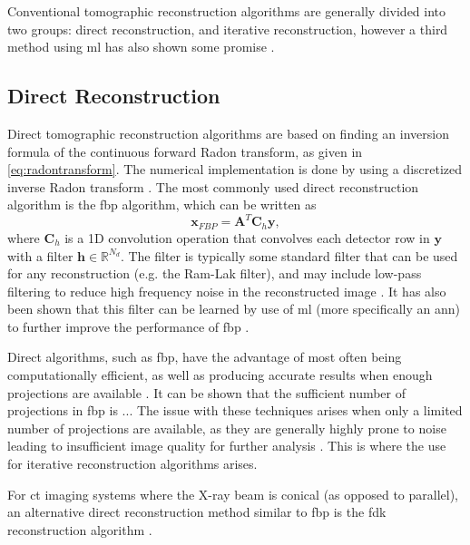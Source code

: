 Conventional tomographic reconstruction algorithms are generally divided into two groups: direct reconstruction, and iterative reconstruction, however a third method using \gls{ml} has also shown some promise \cite{GANrec}.

\subsection{Direct Reconstruction}
Direct tomographic reconstruction algorithms are based on finding an inversion formula of the continuous forward Radon transform, as given in \cref{eq:radontransform}. The numerical implementation is done by using a discretized inverse Radon transform \cite{jimaging4110128}. The most commonly used direct reconstruction algorithm is the \gls{fbp} algorithm, which can be written as \cite{jimaging4110128}
\begin{equation}
    \label{eq:fbp}
    \bm{x}_{FBP} = \bm{A}^T \bm{C}_h \bm{y},
\end{equation}
where $\bm{C}_h$ is a 1D convolution operation that convolves each detector row in $\bm{y}$ with a filter $\bm{h} \in \mathbb{R}^{N_d}$. The filter is typically some standard filter that can be used for any reconstruction (e.g. the Ram-Lak filter), and may include low-pass filtering to reduce high frequency noise in the reconstructed image \cite{681991}. It has also been shown that this filter can be learned by use of \gls{ml} (more specifically an \gls{ann}) to further improve the performance of \gls{fbp} \cite{6607157}. 

Direct algorithms, such as \gls{fbp}, have the advantage of most often being computationally efficient, as well as producing accurate results when enough projections are available \cite{jimaging4110128}. It can be shown that the sufficient number of projections in \gls{fbp} is ... The issue with these techniques arises when only a limited number of projections are available, as they are generally highly prone to noise leading to insufficient image quality for further analysis \cite{jimaging4110128}. This is where the use for iterative reconstruction algorithms arises.

For \gls{ct} imaging systems where the X-ray beam is conical (as opposed to parallel), an alternative direct reconstruction method similar to \gls{fbp} is the \gls{fdk} reconstruction algorithm \cite{Feldkamp:84}. 

